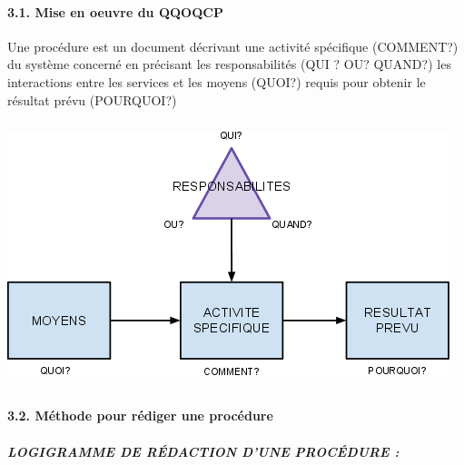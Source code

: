\documentclass{article}
\begin{document}
\paragraph[3.1. Mise en oeuvre du QQOQCP]{3.1. Mise en oeuvre du QQOQCP}
Une procédure est un document décrivant une activité spécifique
(COMMENT?) du système concerné en précisant les responsabilités (QUI ?
OU? QUAND?)  les interactions entre les services et les moyens (QUOI?)
requis pour obtenir le résultat prévu (POURQUOI?)


\bigskip

 \includegraphics[width=12.885cm,height=7.673cm]{BP1-img1.png} 

\paragraph[3.2. Méthode pour rédiger une procédure]{3.2. Méthode pour
rédiger une procédure}

\bigskip

\subparagraph[LOGIGRAMME DE RÉDACTION D’UNE PROCÉDURE :]{LOGIGRAMME DE
RÉDACTION D’UNE PROCÉDURE :}

\bigskip
\end{document}
